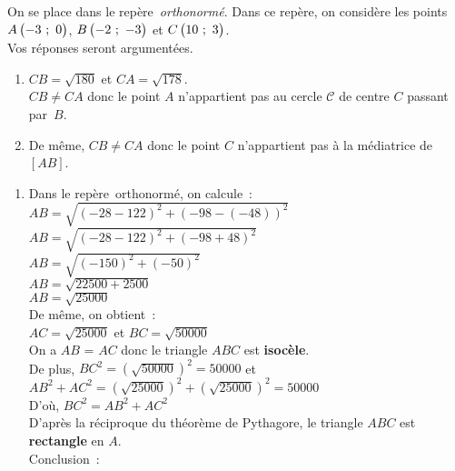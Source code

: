 \vspace*{-2em}

\newpage

\begin{minipage}{0.45\textwidth}
\thispagestyle{correction2}

\vspace*{1em}


\exercice
On se place dans le repère~\emph{orthonormé}. Dans ce repère, on considère les points $A\begin{pmatrix}-3~;~0\end{pmatrix}$, $B\begin{pmatrix}-2~;~-3\end{pmatrix}$ et $C\begin{pmatrix}10~;~3\end{pmatrix}$.\\Vos réponses seront argumentées.

	\begin{enumerate}
		\item $CB = \sqrt{180}$ et $CA = \sqrt{178}$.\\
				$CB \neq CA$ donc le point $A$ n'appartient pas au cercle $\mathscr{C}$ de centre $C$ passant par~$B$.
		\item De même, $CB \neq CA$ donc le point $C$ n'appartient pas à la médiatrice de $\left[AB\right]$.
	\end{enumerate}


\exercice
\begin{enumerate}
	\item Dans le repère~orthonormé, on calcule~:\\ $AB=\sqrt{\left( - 28 - 122  \right) ^ 2 + \left(-98 - \left( -48 \right) \right) ^ 2}$\\
			$AB=\sqrt{\left( - 28 - 122 \right) ^ 2 + \left(-98 + 48 \right) ^ 2}$\\
			$AB=\sqrt{\left( - 150 \right) ^ 2 + \left( - 50 \right) ^ 2}$\\
			$AB=\sqrt{22500 + 2500}$\\
			$AB=\sqrt{25000}$\\[1em]
			De même, on obtient~:\\ $AC = \sqrt{25000}$ et $BC = \sqrt{50000}$\\[1em]
			On a $AB$ = $AC$ donc le triangle $ABC$ est \textbf{isocèle}.\\[1em]
			De plus, $BC^2 = \left(\sqrt{50000}\right)^2 = 50000$ et\\ $AB^2 + AC^2 = \left(\sqrt{25000}\right)^2 + \left(\sqrt{25000}\right)^2 = 50000$\\
			D'où, $BC^2 = AB^2 + AC^2$\\
			D'après la réciproque du théorème de Pythagore, le triangle $ABC$ est \textbf{rectangle} en $A$.\\[1em]
			Conclusion~: 
\end{enumerate}

\end{minipage}

